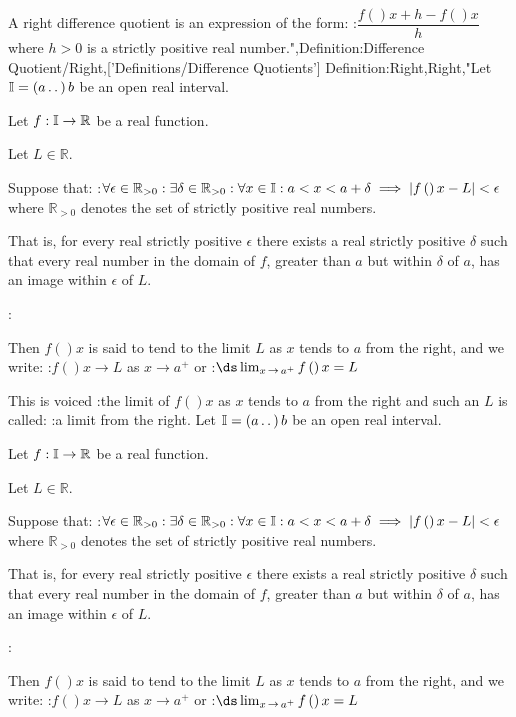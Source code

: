 A right difference quotient is an expression of the form:
:$\dfrac {f \left(   \right){x + h} - f \left(   \right)x} h$
where $h > 0$ is a strictly positive real number.",Definition:Difference Quotient/Right,['Definitions/Difference Quotients']
Definition:Right,Right,"Let $\Bbb I = \left( a \,.\,.\,   \right)b$ be an open real interval.

Let $f: \Bbb I \to \mathbb R$ be a real function.

Let $L \in \mathbb R$.


Suppose that:
:$\forall \epsilon \in \mathbb R_{>0}: \exists \delta \in \mathbb R_{>0}: \forall x \in \Bbb I: a < x < a + \delta \implies \left\lvert f \left(   \right)x - L \right\rvert < \epsilon$
where $\mathbb R_{>0}$ denotes the set of strictly positive real numbers.

That is, for every real strictly positive $\epsilon$ there exists a real strictly positive $\delta$ such that every real number in the domain of $f$, greater than $a$ but within $\delta$ of $a$, has an image within $\epsilon$ of $L$.


:

Then $f \left(   \right)x$ is said to tend to the limit $L$ as $x$ tends to $a$ from the right, and we write:
:$f \left(   \right)x \to L$ as $x \to a^+$
or
:$\ds \lim_{x \mathop \to a^+} f \left(   \right)x = L$


This is voiced
:the limit of $f \left(   \right)x$ as $x$ tends to $a$ from the right
and such an $L$ is called:
:a limit from the right.
Let $\Bbb I = \left( a \,.\,.\,   \right)b$ be an open real interval.

Let $f: \Bbb I \to \mathbb R$ be a real function.

Let $L \in \mathbb R$.


Suppose that:
:$\forall \epsilon \in \mathbb R_{>0}: \exists \delta \in \mathbb R_{>0}: \forall x \in \Bbb I: a < x < a + \delta \implies \left\lvert f \left(   \right)x - L \right\rvert < \epsilon$
where $\mathbb R_{>0}$ denotes the set of strictly positive real numbers.

That is, for every real strictly positive $\epsilon$ there exists a real strictly positive $\delta$ such that every real number in the domain of $f$, greater than $a$ but within $\delta$ of $a$, has an image within $\epsilon$ of $L$.


:

Then $f \left(   \right)x$ is said to tend to the limit $L$ as $x$ tends to $a$ from the right, and we write:
:$f \left(   \right)x \to L$ as $x \to a^+$
or
:$\ds \lim_{x \mathop \to a^+} f \left(   \right)x = L$


